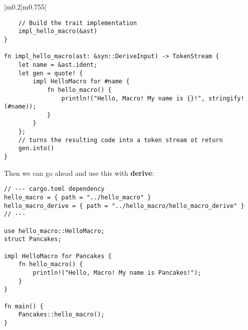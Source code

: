 \documentclass[main.tex,fontsize=8pt,paper=a4,paper=portrait,DIV=calc,]{scrartcl}
\begin{document}
\begin{table}[ht!]
\begin{tabular}{|m{0.2\linewidth}|m{0.755\linewidth}|}
\begin{lstlisting}
    // Build the trait implementation
    impl_hello_macro(&ast)
}

fn impl_hello_macro(ast: &syn::DeriveInput) -> TokenStream {
    let name = &ast.ident;
    let gen = quote! {
        impl HelloMacro for #name {
            fn hello_macro() {
                println!("Hello, Macro! My name is {}!", stringify!(#name));
            }
        }
    };
    // turns the resulting code into a token stream ot return
    gen.into()
}
\end{lstlisting} 
Then we can go ahead and use this with \textbf{derive}:\newline
\begin{lstlisting}
// --- cargo.toml dependency
hello_macro = { path = "../hello_macro" }
hello_macro_derive = { path = "../hello_macro/hello_macro_derive" }
// ---

use hello_macro::HelloMacro;
struct Pancakes;

impl HelloMacro for Pancakes {
    fn hello_macro() {
        println!("Hello, Macro! My name is Pancakes!");
    }
}

fn main() { 
    Pancakes::hello_macro();
}
\end{lstlisting}\\
\hline
\end{tabular}
\end{table}
\pagebreak
\end{document}
